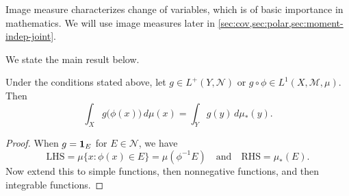 Image measure characterizes change of variables, which is of basic importance in mathematics. We will use image measures later in \cref{sec:cov,sec:polar,sec:moment-indep-joint}.

We state the main result below.
\begin{prop} \label{prop:image-meas-cov}
    Under the conditions stated above, let $g\in L^+(Y,\mathcal{N})$ or $g \circ \phi \in L^1(X,\mathcal{M},\mu)$. Then \begin{equation*}
        \int_X g\bigl(\phi(x)\bigr) \,d\mu(x) = \int_Y g(y) \,d\mu_*(y). %
    \end{equation*}
\end{prop}
\begin{proof}
    When $g = \mathbf{1}_E$ for $E \in \mathcal{N}$, we have \[
        \text{LHS} = \mu\{x : \phi(x) \in E\} = \mu(\phi^{-1} E) \quad \text{and} \quad 
        \text{RHS} = \mu_{*}(E).
    \] Now extend this to simple functions, then nonnegative functions, and then integrable functions.
\end{proof}